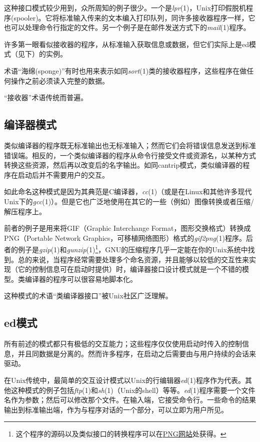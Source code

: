\documentclass[12pt,oneside]{book}
\begin{document}
这种接口模式较少用到，众所周知的例子很少。一个是\textit{lpr}(1)，Unix打印假脱机程序(spooler)。它将标准输入传来的文本编入打印队列，同许多接收器程序一样，它也可以处理命令行指定的文件。另一个例子是在邮件发送方式下的\textit{mail}(1)程序。

许多第一眼看似接收器的程序，从标准输入获取信息或数据，但它们实际上是ed模式（见下）的实例。

术语“海绵(sponge)”有时也用来表示如同\textit{sort}(1)类的接收器程序，这些程序在做任何操作之前必须读入完整的数据。

“接收器”术语传统而普遍。

\subsection{编译器模式}
类似编译器的程序既无标准输出也无标准输入；然而它们会将错误信息发送到标准错误端。相反的，一个类似编译器的程序从命令行接受文件或资源名，以某种方式转换这些资源，然后再以改变后的名字输出。如同cantrip模式，类似编译器的程序在启动后并不需要用户的交互。

如此命名这种模式是因为其典范是C编译器，\textit{cc}(1)（或是在Linux和其他许多现代Unix下的\textit{gcc}(1)）。但是它也广泛地使用在其它的一些（例如）图像转换或者压缩/解压程序上。

前者的例子是用来将GIF（Graphic Interchange Format，图形交换格式）转换成PNG（Portable Network Graphics，可移植网络图形）格式的\textit{gif2png}(1)程序。后者的例子是\textit{gzip}(1)和\textit{gunzip}(1)\footnote{这个程序的源码以及类似接口的转换程序可以在\href{http://www.cdrom.com/pub/png/}{PNG网站}处获得。}，GNU的压缩程序几乎一定能在你的Unix系统中找到。总的来说，当程序经常需要处理多个命名资源，并且能够以较低的交互性来实现（它的控制信息可在启动时提供）时，编译器接口设计模式就是一个不错的模型。类编译器的程序可以很容易地脚本化。

这种模式的术语“类编译器接口”被Unix社区广泛理解。

\subsection{ed模式}
所有前述的模式都只有极低的交互能力；这些程序仅仅使用启动时传入的控制信息，并且同数据是分离的。然而许多程序，在启动之后需要由与用户持续的会话来驱动。

在Unix传统中，最简单的交互设计模式以Unix的行编辑器\textit{ed}(1)程序作为代表。其他这种模式的例子包括\textit{ftp}(1)和\textit{sh}(1)（Unix的shell）等等。\textit{ed}(1)程序需要一个文件名作为参数；然后可以修改那个文件。在输入端，它接受命令行。一些命令的结果输出到标准输出端，作为与程序对话的一个部分，可以立即为用户所见。
\end{document}
